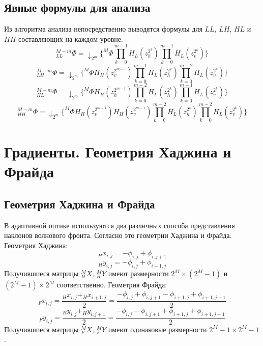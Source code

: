 \documentclass[oneside, final, 14pt]{article}
\begin{document}
\subsection{Явные формулы для анализа}
Из алгоритма анализа непосредственно выводятся формулы для $LL$, $LH$, $HL$ и $HH$ составляющих на каждом уровне.
\begin{equation}\label{LL}
_{LL}^{M-m}\Phi=
\downarrow_{2^m} \{^M\Phi\prod\limits_{k = 0}^{m-1} H_L(z_h^{2^k})
							\prod\limits_{k = 0}^{m-1} H_L(z_v^{2^k})\}
\end{equation}
\begin{equation}\label{LH}
_{LH}^{M-m}\Phi=
\downarrow_{2^m} \{^M\Phi H_H(z_v^{2^{m-1}}) \prod\limits_{k = 0}^{m-1} H_L(z_h^{2^k})
							\prod\limits_{k = 0}^{m-2} H_L(z_v^{2^k})\}
\end{equation}
\begin{equation}\label{HL}
_{HL}^{M-m}\Phi=\downarrow_{2^m} \{^M\Phi H_H(z_h^{2^{m-1}}) \prod\limits_{k = 0}^{m-2} H_L(z_h^{2^k})
						\prod\limits_{k = 0}^{m-1} H_L(z_v^{2^k})\}
\end{equation}
\begin{equation}\label{HH}
_{HH}^{M-m}\Phi=\downarrow_{2^m} \{^M\Phi H_H(z_v^{2^{m-1}}) H_H(z_v^{2^{m-1}}) \prod\limits_{k = 0}^{m-2} H_L(z_h^{2^k})
							\prod\limits_{k = 0}^{m-2} H_L(z_v^{2^k})\}
\end{equation}

\section{Градиенты. Геометрия Хаджина и Фрайда}
\subsection{Геометрия Хаджина и Фрайда}
В адаптивной оптике используются два различных способа представления наклонов волнового фронта. Согласно \cite{how}
это геометрии Хаджина и Фрайда.
Геометрия Хаджина:
$$_{H}x_{i,j}=-\phi_{i,j}+\phi_{i,j+1}$$
$$_{H}y_{i,j}=-\phi_{i,j}+\phi_{i+1,j}$$
Получившиеся матрицы $_H^{M}X$, $_H^{M}Y$ имеют размерности $2^M \times(2^M - 1)$ и $(2^M - 1) \times 2^M$ соответственно.
Геометрия Фрайда:
$$_{F}x_{i,j}=\frac{_{H}x_{i,j} + _{H}x_{i+1,j}}{2} = \frac{-\phi_{i,j}+\phi_{i,j+1}-\phi_{i+1,j}+\phi_{i+1,j+1}}{2}$$
$$_{F}y_{i,j}=\frac{_{H}y_{i,j} + _{H}y_{i,j+1}}{2} = \frac{-\phi_{i,j}-\phi_{i,j+1}+\phi_{i+1,j}+\phi_{i+1,j+1}}{2}$$
Получившиеся матрицы $_F^{M}X$, $_F^{M}Y$ имеют одинаковые размерности $2^M - 1 \times 2^M - 1$.
\end{document}
